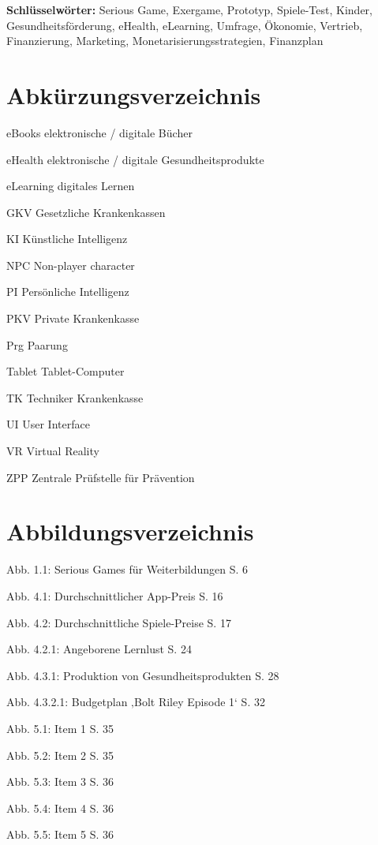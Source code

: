 \documentclass[
  a4paper,
  DIV=11,
  numbers=noendperiod,
  onecolumn,
  oneside,
  a4paper]{scrartcl}
\begin{document}
\textbf{Schlüsselwörter:} Serious Game, Exergame, Prototyp, Spiele-Test,
Kinder, Gesundheitsförderung, eHealth, eLearning, Umfrage, Ökonomie,
Vertrieb, Finanzierung, Marketing, Monetarisierungsstrategien,
Finanzplan

\section{Abkürzungsverzeichnis}\label{abkuxfcrzungsverzeichnis}

eBooks elektronische / digitale Bücher

eHealth elektronische / digitale Gesundheitsprodukte

eLearning digitales Lernen

GKV Gesetzliche Krankenkassen

KI Künstliche Intelligenz

NPC Non-player character

PI Persönliche Intelligenz

PKV Private Krankenkasse

Prg Paarung

Tablet Tablet-Computer

TK Techniker Krankenkasse

UI User Interface

VR Virtual Reality

ZPP Zentrale Prüfstelle für Prävention

\section{Abbildungsverzeichnis}\label{abbildungsverzeichnis}

Abb. 1.1: Serious Games für Weiterbildungen S. 6

Abb. 4.1: Durchschnittlicher App-Preis S. 16

Abb. 4.2: Durchschnittliche Spiele-Preise S. 17

Abb. 4.2.1: Angeborene Lernlust S. 24

Abb. 4.3.1: Produktion von Gesundheitsprodukten S. 28

Abb. 4.3.2.1: Budgetplan ‚Bolt Riley Episode 1` S. 32

Abb. 5.1: Item 1 S. 35

Abb. 5.2: Item 2 S. 35

Abb. 5.3: Item 3 S. 36

Abb. 5.4: Item 4 S. 36

Abb. 5.5: Item 5 S. 36
\end{document}
